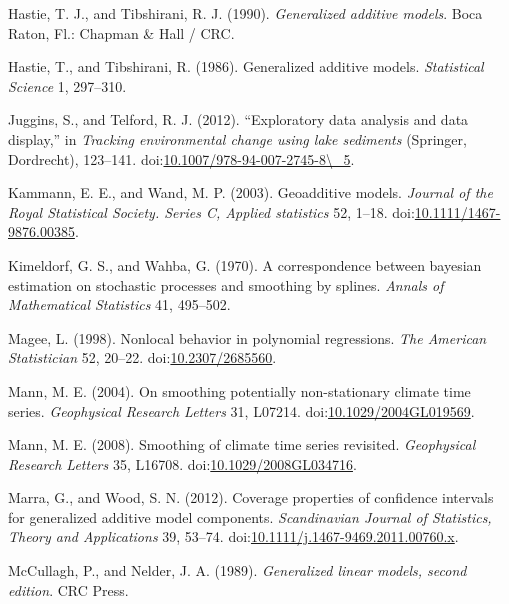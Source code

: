 \documentclass[12pt,]{article}
\begin{document}
\hypertarget{ref-Hastie1990-bx}{}
Hastie, T. J., and Tibshirani, R. J. (1990). \emph{Generalized additive
models}. Boca Raton, Fl.: Chapman \& Hall / CRC.

\hypertarget{ref-Hastie1986-xs}{}
Hastie, T., and Tibshirani, R. (1986). Generalized additive models.
\emph{Statistical Science} 1, 297--310.

\hypertarget{ref-Juggins2012-uu}{}
Juggins, S., and Telford, R. J. (2012). ``Exploratory data analysis and
data display,'' in \emph{Tracking environmental change using lake
sediments} (Springer, Dordrecht), 123--141.
doi:\href{https://doi.org/10.1007/978-94-007-2745-8/_5}{10.1007/978-94-007-2745-8\textbackslash{}\_5}.

\hypertarget{ref-Kammann2003-pi}{}
Kammann, E. E., and Wand, M. P. (2003). Geoadditive models.
\emph{Journal of the Royal Statistical Society. Series C, Applied
statistics} 52, 1--18.
doi:\href{https://doi.org/10.1111/1467-9876.00385}{10.1111/1467-9876.00385}.

\hypertarget{ref-Kimeldorf1970-cn}{}
Kimeldorf, G. S., and Wahba, G. (1970). A correspondence between
bayesian estimation on stochastic processes and smoothing by splines.
\emph{Annals of Mathematical Statistics} 41, 495--502.

\hypertarget{ref-Magee1998-oq}{}
Magee, L. (1998). Nonlocal behavior in polynomial regressions. \emph{The
American Statistician} 52, 20--22.
doi:\href{https://doi.org/10.2307/2685560}{10.2307/2685560}.

\hypertarget{ref-Mann2004-kd}{}
Mann, M. E. (2004). On smoothing potentially non-stationary climate time
series. \emph{Geophysical Research Letters} 31, L07214.
doi:\href{https://doi.org/10.1029/2004GL019569}{10.1029/2004GL019569}.

\hypertarget{ref-Mann2008-yk}{}
Mann, M. E. (2008). Smoothing of climate time series revisited.
\emph{Geophysical Research Letters} 35, L16708.
doi:\href{https://doi.org/10.1029/2008GL034716}{10.1029/2008GL034716}.

\hypertarget{ref-Marra2012-bq}{}
Marra, G., and Wood, S. N. (2012). Coverage properties of confidence
intervals for generalized additive model components. \emph{Scandinavian
Journal of Statistics, Theory and Applications} 39, 53--74.
doi:\href{https://doi.org/10.1111/j.1467-9469.2011.00760.x}{10.1111/j.1467-9469.2011.00760.x}.

\hypertarget{ref-McCullagh1989-gv}{}
McCullagh, P., and Nelder, J. A. (1989). \emph{Generalized linear
models, second edition}. CRC Press.
\end{document}
